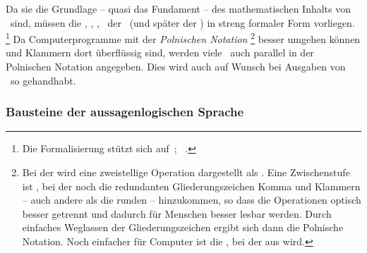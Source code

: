 Da sie die Grundlage -- quasi das Fundament -- des mathematischen Inhalts von \ASBA\ sind, müssen die \Axiome, \Saetze, \Beweise, \textusw\ der \Aussagenlogik\ (und später der \Praedikatenlogik) in streng formaler Form vorliegen.%
\footnote{%
	Die Formalisierung stützt sich auf~\cite{bib:Aussagenlogik}; \alsoname~\cite{bib:LogikDe, bib:LogikEn}.
}
Da Computerprogramme mit der \emph{Polnischen Notation}%
\footnote{%
	Bei der  wird eine zweistellige Operation  dargestellt als .
	Eine Zwischenstufe ist , bei der noch die redundanten Gliederungszeichen Komma und Klammern -- auch andere als die runden -- hinzukommen, so dass die Operationen optisch besser getrennt und dadurch für Menschen besser lesbar werden.
	Durch einfaches Weglassen der Gliederungszeichen ergibt sich dann die Polnische Notation.
	Noch einfacher für Computer ist die , bei der aus   wird.
}
besser umgehen können und Klammern dort überflüssig sind, werden viele \Formeln\ auch parallel in der Polnischen Notation angegeben.
Dies wird auch auf Wunsch bei Ausgaben von \ASBA\ so gehandhabt.

\subsubsection{Bausteine der aussagenlogischen Sprache}%
\label{subsub:Bausteine}


